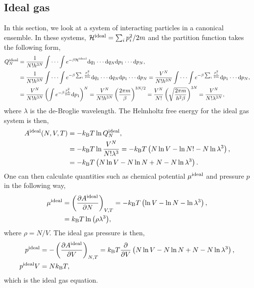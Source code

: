 \documentclass[a4paper]{article}
\begin{document}
\subsection{Ideal gas}
In this section, we look at a system of interacting particles in a canonical ensemble. In these systems, $\mathcal{H}^{\rm ideal}=\sum_{i}p_{i}^{2}/2m$ and the partition function takes the following form,
\begin{equation}\label{eq:partitionfunctionideal}
\begin{split}
Q_{N}^{\rm ideal}&=\frac{1}{N!h^{3N}}\int\cdot\cdot\cdot\int e^{-\beta \mathcal{H}^{\rm ideal}}{\rm d}q_{1}\cdot\cdot\cdot {\rm d}q_{N}{\rm d}p_{1}\cdot\cdot\cdot {\rm d}p_{N},\\
&=\frac{1}{N!h^{3N}}\int\cdot\cdot\cdot\int e^{-\beta \sum_{i}\frac{p_{i}^{2}}{2m}}{\rm d}q_{1}\cdot\cdot\cdot {\rm d}q_{N}{\rm d}p_{1}\cdot\cdot\cdot {\rm d}p_{N}=\frac{V^{N}}{N!h^{3N}}\int\cdot\cdot\cdot\int e^{-\beta \sum_{i}\frac{p_{i}^{2}}{2m}}{\rm d}p_{1}\cdot\cdot\cdot {\rm d}p_{N},\\
&=\frac{V^{N}}{N!h^{3N}}\left(\int e^{-\beta \frac{p_{1}^{2}}{2m}}{\rm d}p_{1}\right)^{N}=\frac{V^{N}}{N!h^{3N}}\left(\frac{2\pi m}{\beta}\right)^{3N/2}=\frac{V^{N}}{N!}\left(\sqrt{\frac{2\pi m}{h^{2}\beta}}\right)^{3N}=\frac{V^{N}}{N!\lambda^{3N}},\\
\end{split}
\end{equation}
where $\lambda$ is the de-Broglie wavelength. The Helmholtz free energy for the ideal gas system is then,
\begin{equation}
\begin{split}
A^{\rm ideal}(N,V,T)&=-k_{\rm B}T\ln{Q_{N}^{\rm ideal}},\\
&=-k_{\rm B}T\ln{\frac{V^{N}}{N!\lambda^{3}}}=-k_{\rm B}T\left(N\ln{V}-\ln{N!}-N\ln{\lambda^{3}}\right),\\
&=-k_{\rm B}T\left(N\ln{V}-N\ln{N}+N-N\ln{\lambda^{3}}\right).
\end{split}
\end{equation}
One can then calculate quantities such as chemical potential $\mu^{\rm ideal}$ and pressure $p$ in the following way,
\begin{equation}
\begin{split}
\mu^{\rm ideal}&=\left(\frac{\partial A^{\rm ideal}}{\partial N}\right)_{V,T}=-k_{\rm B}T\left(\ln{V}-\ln{N}-\ln{\lambda^{3}}\right),\\
&=k_{\rm B}T\ln{\left(\rho\lambda^{3}\right)},
\end{split}
\end{equation}
where $\rho=N/V$. The ideal gas pressure is then,
\begin{equation}
\begin{split}
p^{\rm ideal}&=-\left(\frac{\partial A^{\rm ideal}}{\partial V}\right)_{N,T}=k_{\rm B}T\frac{\partial}{\partial V}\left(N\ln{V}-N\ln{N}+N-N\ln{\lambda^{3}}\right),\\
p^{\rm ideal}V&=Nk_{\rm B}T,
\end{split}
\end{equation}
which is the ideal gas equation.
\end{document}

